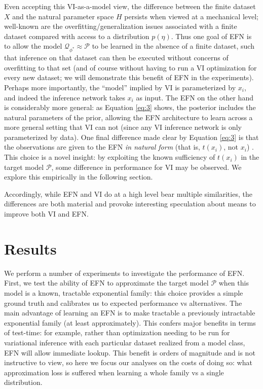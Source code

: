 \documentclass[twoside]{article}
\begin{document}
Even accepting this VI-as-a-model view, the difference between the finite dataset $X$ and the natural parameter space $H$ persists when viewed at a mechanical level; well-known are the overfitting/generalization issues associated with a finite dataset compared with access to a distribution $p(\eta)$.    Thus one goal of EFN is to allow the model $\mathcal{Q}_{\phi^*} \approx \mathcal{P}$ to be learned in the absence of a finite dataset, such that inference on that dataset can then be executed without concerns of overfitting to that set (and of course without having to run a VI optimization for every new dataset; we will demonstrate this benefit of EFN in the experiments).   Perhaps more importantly, the ``model'' implied by VI is parameterized by $x_i$, and indeed the inference network takes $x_i$ as input.  The EFN on the other hand is considerably more general:  as Equation \ref{eq:3} shows, the posterior includes the natural parameters of the prior, allowing the EFN architecture to learn across a more general setting that VI can not (since any VI inference network is only parameterized by data).  One final difference made clear by Equation \ref{eq:3} is that the observations are given to the EFN \emph{in natural form} (that is, $t(x_i)$, not $x_i$) \citep{robert2007bayesian}.  This choice is a novel insight: by exploiting the known sufficiency of $t(x_i)$ in the target model $\mathcal{P}$, some difference in performance for VI may be observed.  We explore this empirically in the following section.

Accordingly, while EFN and VI do at a high level bear multiple similarities, the differences are both material and provoke interesting speculation about means to improve both VI and EFN.


\section{Results}

We perform a number of experiments to investigate the performance of EFN.  First, we test the ability of EFN to approximate the target model $\mathcal{P}$ when this model is a known, tractable exponential family: this choice provides a simple ground truth and calibrates us to expected performance vs alternatives.    The main advantage of learning an EFN is to make tractable a previously intractable exponential family (at least approximately).  This confers major benefits in terms of test-time: for example, rather than optimization needing to be run for variational inference with each particular dataset realized from a model class, EFN will allow immediate lookup.  This benefit is orders of magnitude and is not instructive to view, so here we focus our analyses on the costs of doing so: what approximation loss is suffered when learning a whole family vs a single distribution.  
\end{document}
